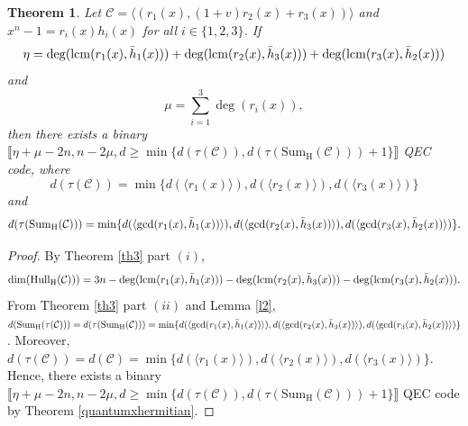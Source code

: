 \documentclass[pdflatex,sn-mathphys-num]{sn-jnl}%
\theoremstyle{thmstyleone}%
\newtheorem{theorem}{Theorem}%
\theoremstyle{thmstyletwo}%
\theoremstyle{thmstylethree}%
\begin{document}
\begin{theorem}
\label{th12} Let $\mathcal{C}=\langle
(r_{1}(x),(1+v)r_{2}(x)+r_{3}(x))\rangle $ and $x^{n}-1=r_{i}(x)h_{i}(x)$
for all $i\in \{1,2,3\}$. If
\begin{equation*}
\eta =\mathrm{deg}(\mathrm{lcm}(r_1(x),\Bar{h}_1(x)))+\mathrm{deg}(\mathrm{lcm}(r_2(x),\Bar{h}_3(x)))+\mathrm{deg}(\mathrm{lcm}(r_3(x),\Bar{h}_2(x)))
\end{equation*}
and
\begin{equation*}
\mu ={{\overset{3}{\underset{i=1}{{\sum }}}}}\mathrm{\deg }(r_{i}(x)),
\end{equation*}
then there exists a binary $\llbracket\eta +\mu -2n,n-2\mu ,d\geq \mathrm{\min }\{d(\tau (\mathcal{C})),d(\tau (\mathrm{Sum_{H}}(\mathcal{C})))+1\}\rrbracket$ QEC code, where
\begin{equation*}
d(\tau (\mathcal{C}))=\mathrm{\min }\{d(\langle r_{1}(x)\rangle ),d(\langle
r_{2}(x)\rangle ),d(\langle r_{3}(x)\rangle )\}
\end{equation*}
and
\begin{equation*}
d(\tau (\mathrm{Sum_{H}}(\mathcal{C})))=\mathrm{\min }\{d(\langle \mathrm{\gcd }(r_{1}(x),\Bar{h}_{1}(x))\rangle ),d(\langle \mathrm{\gcd }(r_{2}(x),\Bar{h}_{3}(x))\rangle ),d(\langle \mathrm{\gcd }(r_{3}(x),\Bar{h}_{2}(x))\rangle )\}.
\end{equation*}
\end{theorem}

\begin{proof}
By Theorem \ref{th3} part $(i)$,
\begin{equation*}
\mathrm{dim}(\mathrm{Hull_H}(\mathcal{C})))=3n-\mathrm{deg}(\mathrm{lcm}(r_1(x),\Bar{h}_1(x)))-\mathrm{deg}(\mathrm{lcm}(r_2(x),\Bar{h}_3(x)))-\mathrm{deg}(\mathrm{lcm}(r_3(x),\Bar{h}_2(x))).
\end{equation*}
From Theorem \ref{th3} part $(ii)$ and Lemma \ref{l2}, $d(\mathrm{Sum_{H}}(\tau (\mathcal{C})))=d(\tau (\mathrm{Sum_{H}}(\mathcal{C})))=\mathrm{\min } \{d(\langle \mathrm{\gcd }(r_{1}(x),\Bar{h}_{1}(x))\rangle ),d(\langle \mathrm{\gcd }(r_{2}(x),\Bar{h}_{3}(x))\rangle ),d(\langle \mathrm{\gcd }(r_{3}(x),\Bar{h}_{2}(x))\rangle )\}$. Moreover, $d(\tau (\mathcal{C}))=d(\mathcal{C})=\mathrm{\min }\{d(\langle r_{1}(x)\rangle ),d(\langle r_{2}(x)\rangle ),d(\langle r_{3}(x)\rangle )\}$. Hence, there exists a binary $\llbracket\eta +\mu -2n,n-2\mu ,d\geq \mathrm{\min }\{d(\tau (\mathcal{C})),d(\tau (\mathrm{Sum_{H}}(\mathcal{C})))+1\}\rrbracket$ QEC code by Theorem \ref{quantumxhermitian}.
\end{proof}
\end{document}
